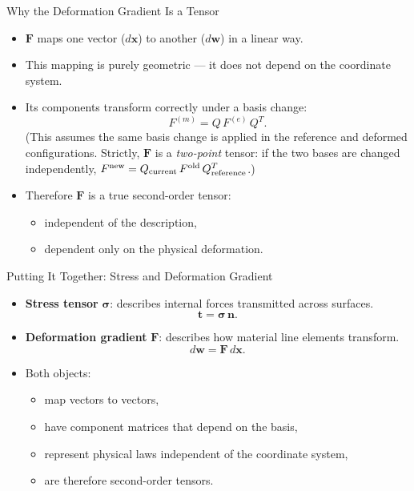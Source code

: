 \documentclass[aspectratio=169,11pt]{beamer}
\begin{document}
\begin{frame}{Why the Deformation Gradient Is a Tensor}

\begin{itemize}

\item $\mathbf{F}$ maps one vector ($d\mathbf{x}$) to another ($d\mathbf{w}$) in a linear way.
\item This mapping is purely geometric — it does not depend on the coordinate system.
\item Its components transform correctly under a basis change:
\[
F^{(m)} = Q\,F^{(e)}\,Q^T.
\]
(This assumes the same basis change is applied in the reference and deformed configurations. Strictly, $\mathbf{F}$ is a \emph{two-point} tensor: if the two bases are changed independently, $F^{\rm new} = Q_{\rm current}\,F^{\rm old}\,Q_{\rm reference}^T$.)

\item Therefore $\mathbf{F}$ is a true second-order tensor:
\begin{itemize}
  \item independent of the description,
  \item dependent only on the physical deformation.
\end{itemize}

\end{itemize}

\end{frame}

\begin{frame}{Putting It Together: Stress and Deformation Gradient}

\begin{itemize}

\item \textbf{Stress tensor} $\boldsymbol{\sigma}$: describes internal forces transmitted across surfaces.
\[
\mathbf{t} = \boldsymbol{\sigma}\,\mathbf{n}.
\]

\item \textbf{Deformation gradient} $\mathbf{F}$: describes how material line elements transform.
\[
d\mathbf{w} = \mathbf{F}\,d\mathbf{x}.
\]

\item Both objects:
\begin{itemize}
  \item map vectors to vectors,
  \item have component matrices that depend on the basis,
  \item represent physical laws independent of the coordinate system,
  \item are therefore second-order tensors.
\end{itemize}

\end{itemize}

\end{frame}
\end{document}
